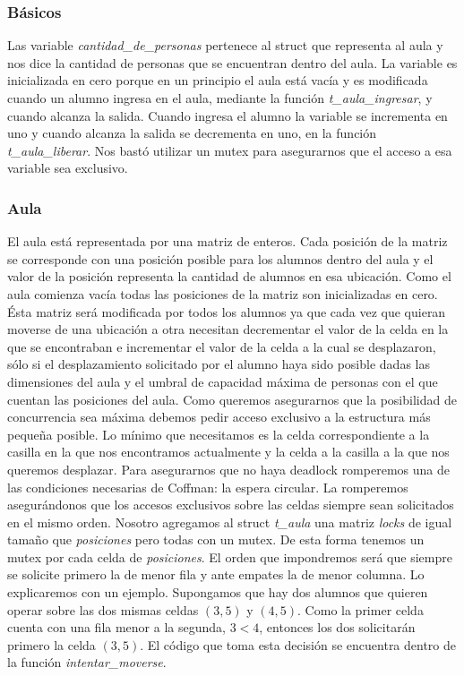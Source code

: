 \subsubsection{Básicos}
Las variable \textit{cantidad\_de\_personas} pertenece al struct que representa al aula y
nos dice la cantidad de personas que se encuentran dentro del aula. La variable es
inicializada en cero porque en un principio el aula está vacía y es modificada cuando 
un alumno ingresa en el aula, mediante la función \textit{t\_aula\_ingresar}, y cuando
alcanza la salida. Cuando ingresa el alumno la variable se incrementa en uno y cuando alcanza
la salida se decrementa en uno, en la función \textit{t\_aula\_liberar}. Nos bastó 
utilizar un mutex para asegurarnos que el acceso a esa variable sea exclusivo.

\subsubsection{Aula}
El aula está representada por una matriz de enteros. Cada posición de la matriz se corresponde
con una posición posible para los alumnos dentro del aula y el valor de la posición 
representa la cantidad de alumnos en esa ubicación. Como el aula comienza vacía todas
las posiciones de la matriz son inicializadas en cero. Ésta matriz será modificada
por todos los alumnos ya que cada vez que quieran moverse de una ubicación a otra necesitan
decrementar el valor de la celda en la que se encontraban e incrementar el valor de la celda
a la cual se desplazaron, sólo si el desplazamiento solicitado por el alumno haya sido
posible dadas las dimensiones del aula y el umbral de capacidad máxima de personas
con el que cuentan las posiciones del aula. Como queremos asegurarnos que la posibilidad de
concurrencia sea máxima debemos pedir acceso exclusivo a la estructura más pequeña posible.
Lo mínimo que necesitamos es la celda correspondiente a la casilla en la que nos
encontramos actualmente y la celda a la casilla a la que nos queremos desplazar. 
Para asegurarnos que no haya deadlock romperemos una de las condiciones necesarias de Coffman:
la espera circular. La romperemos asegurándonos que los accesos exclusivos sobre las celdas
siempre sean solicitados en el mismo orden. Nosotro agregamos al struct \textit{t\_aula} una
matriz \textit{locks} de igual tamaño que \textit{posiciones} pero todas con un mutex. De esta
forma tenemos un mutex por cada celda de \textit{posiciones}. El orden que impondremos
será que siempre se solicite primero la de menor fila y ante empates la de menor columna.
Lo explicaremos con un ejemplo. Supongamos que hay dos alumnos que quieren operar sobre las
dos mismas celdas $(3, 5)$ y $(4, 5)$. Como la primer celda cuenta con una fila menor a la
segunda, $3 < 4$, entonces los dos solicitarán primero la celda $(3, 5)$. El código
que toma esta decisión se encuentra dentro de la función \textit{intentar\_moverse}.

